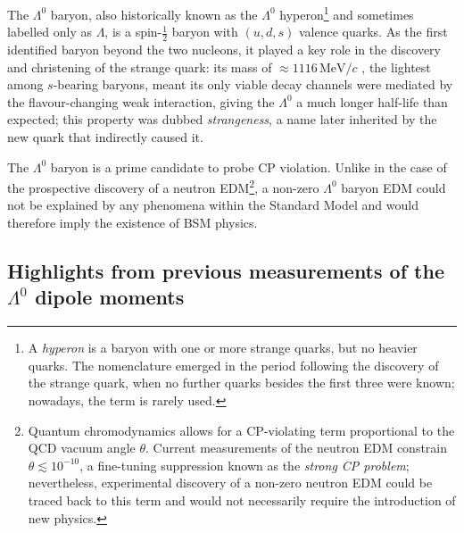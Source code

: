 The $\Lambda^0$ baryon, also historically known as the $\Lambda^0$ hyperon\footnote{A \textit{hyperon} is a baryon with one or more strange quarks, but no heavier quarks. The nomenclature emerged in the period following the discovery of the strange quark, when no further quarks besides the first three were known; nowadays, the term is rarely used.} and sometimes labelled only as $\Lambda$, is a spin-$\frac{1}{2}$ baryon with $(u,d,s)$ valence quarks.
As the first identified baryon beyond the two nucleons, it played a key role in the discovery and christening of the strange quark:
its mass of $\approx 1116\,\text{MeV}/c$ \cite{PDG}, the lightest among $s$-bearing baryons, meant its only viable decay channels were mediated by the flavour-changing weak interaction, giving the $\Lambda^0$ a much longer half-life than expected;
this property was dubbed \textit{strangeness}, a name later inherited by the new quark that indirectly caused it.

The $\Lambda^0$ baryon is a prime candidate to probe CP violation.
Unlike in the case of the prospective discovery of a neutron
EDM\footnote{Quantum chromodynamics allows for a CP-violating term proportional to the QCD vacuum angle $\theta$. Current measurements of the neutron EDM \cite{neutronTheta} constrain $\theta \lesssim {10}^{-10}$,
a fine-tuning suppression known as the \textit{strong CP problem}; nevertheless, experimental discovery of a non-zero neutron EDM could be traced back to this term and would not necessarily require the introduction of new physics.},
a non-zero $\Lambda^0$ baryon EDM could not be explained by any phenomena within the Standard Model and would therefore imply the existence of BSM physics.

\subsection{Highlights from previous measurements of the \texorpdfstring{$\Lambda^0$}{Lambda} dipole moments}

